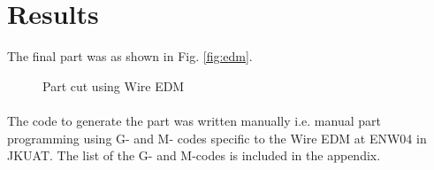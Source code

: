 \section{Results}
The final part was as shown in Fig. \ref{fig:edm}.
\begin{figure}[!htb]%
	\centering
	\qquad
	\caption[Final part]{Part cut using Wire EDM}%
	\label{fig:result}%
\end{figure}
\paragraph{}

The code to generate the part was written manually i.e. manual part programming using G- and M- codes specific to the Wire EDM at ENW04 in JKUAT. The list of the G- and M-codes is included in the appendix.